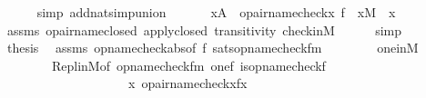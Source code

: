 \begin{isabellebody}
\ \ \ \ \isamarkupfalse%
\ {\isacharparenleft}{\kern0pt}simp\ add{\isacharcolon}{\kern0pt}nat{\isacharunderscore}{\kern0pt}simp{\isacharunderscore}{\kern0pt}union{\isacharparenright}{\kern0pt}\isanewline
\ \ \isamarkupfalse%
\isanewline
\ \ \isamarkupfalse%
\ {\isachardoublequoteopen}x{\isasymin}A\ {\isasymLongrightarrow}\ opair{\isacharunderscore}{\kern0pt}name{\isacharparenleft}{\kern0pt}check{\isacharparenleft}{\kern0pt}x{\isacharparenright}{\kern0pt}{\isacharcomma}{\kern0pt}\ f\ {\isacharbackquote}{\kern0pt}\ x{\isacharparenright}{\kern0pt}{\isasymin}M{\isachardoublequoteclose}\ \ x\isanewline
\ \ \ \ \isamarkupfalse%
\ assms\ opair{\isacharunderscore}{\kern0pt}name{\isacharunderscore}{\kern0pt}closed\ apply{\isacharunderscore}{\kern0pt}closed\ transitivity\ check{\isacharunderscore}{\kern0pt}in{\isacharunderscore}{\kern0pt}M\isanewline
\ \ \ \ \isamarkupfalse%
\ simp\isanewline
\ \ \isamarkupfalse%
\isanewline
\ \ \isamarkupfalse%
\ {\isacharquery}{\kern0pt}thesis\ \isamarkupfalse%
\ assms\ opname{\isacharunderscore}{\kern0pt}check{\isacharunderscore}{\kern0pt}abs{\isacharbrackleft}{\kern0pt}of\ f{\isacharbrackright}{\kern0pt}\ sats{\isacharunderscore}{\kern0pt}opname{\isacharunderscore}{\kern0pt}check{\isacharunderscore}{\kern0pt}fm\isanewline
\ \ \ \ \ \ \ \ one{\isacharunderscore}{\kern0pt}in{\isacharunderscore}{\kern0pt}M\isanewline
\ \ \ \ \ \ \ \ Repl{\isacharunderscore}{\kern0pt}in{\isacharunderscore}{\kern0pt}M{\isacharbrackleft}{\kern0pt}of\ {\isachardoublequoteopen}opname{\isacharunderscore}{\kern0pt}check{\isacharunderscore}{\kern0pt}fm{\isacharparenleft}{\kern0pt}{}{\isacharcomma}{\kern0pt}{}{\isacharcomma}{\kern0pt}{}{\isacharcomma}{\kern0pt}{}{\isacharparenright}{\kern0pt}{\isachardoublequoteclose}\ {\isachardoublequoteopen}{\isacharbrackleft}{\kern0pt}one{\isacharcomma}{\kern0pt}f{\isacharbrackright}{\kern0pt}{\isachardoublequoteclose}\ {\isachardoublequoteopen}is{\isacharunderscore}{\kern0pt}opname{\isacharunderscore}{\kern0pt}check{\isacharparenleft}{\kern0pt}f{\isacharparenright}{\kern0pt}{\isachardoublequoteclose}\ \isanewline
\ \ \ \ \ \ \ \ \ \ \ \ \ \ \ \ \ \ \ \ {\isachardoublequoteopen}{\isasymlambda}x{\isachardot}{\kern0pt}\ opair{\isacharunderscore}{\kern0pt}name{\isacharparenleft}{\kern0pt}check{\isacharparenleft}{\kern0pt}x{\isacharparenright}{\kern0pt}{\isacharcomma}{\kern0pt}f{\isacharbackquote}{\kern0pt}x{\isacharparenright}{\kern0pt}{\isachardoublequoteclose}{\isacharbrackright}{\kern0pt}\ \isanewline

\end{isabellebody}
